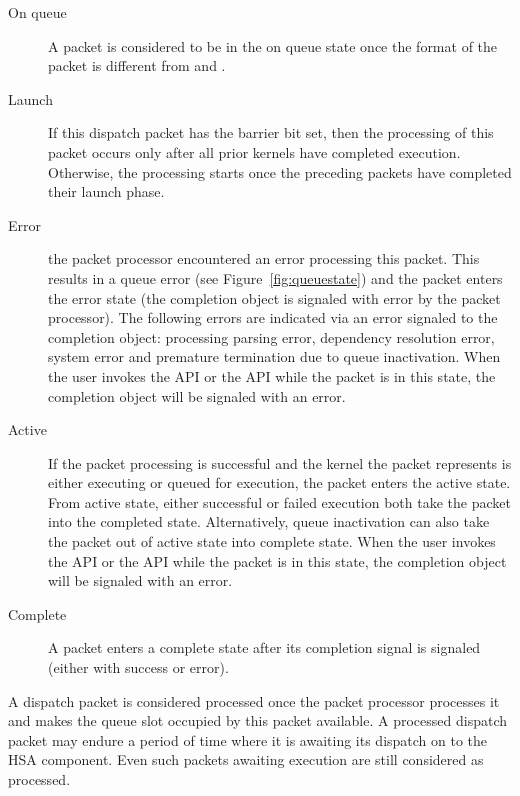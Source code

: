 \documentclass[draft]{book}
\begin{document}
\begin{description}
\item[On queue] A packet is considered to be in the on queue state once the
  format of the packet is different from
   and
  .

\item[Launch] If this dispatch packet has the barrier bit set, then the
  processing of this packet occurs only after all prior kernels have completed
  execution. Otherwise, the processing starts once the preceding packets have
  completed their launch phase.

\item[Error] the packet processor encountered an error processing this
  packet. This results in a queue error (see Figure~\ref{fig:queuestate}) and
  the packet enters the error state (the completion object is signaled with
  error by the packet processor). The following errors are indicated via an
  error signaled to the completion object: processing parsing error, dependency
  resolution error, system error and premature termination due to queue
  inactivation. When the user invokes the  API
  or the  API while the packet is in this state, the
  completion object will be signaled with an error.

\item[Active] If the packet processing is successful and the kernel the
  packet represents is either executing or queued for execution, the packet
  enters the active state. From active state, either successful or failed
  execution both take the packet into the completed state. Alternatively, queue
  inactivation can also take the packet out of active state into complete state.
  When the user invokes the  API or the
   API while the packet is in this state, the
  completion object will be signaled with an error.

\item[Complete] A packet enters a complete state after its completion
  signal is signaled (either with success or error).
\end{description}

A dispatch packet is considered processed once the packet processor processes it
and makes the queue slot occupied by this packet available. A processed dispatch
packet may endure a period of time where it is awaiting its dispatch on to the
HSA component. Even such packets awaiting execution are still considered as
processed.
\end{document}
